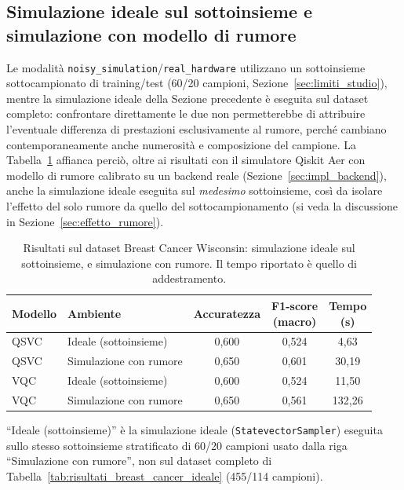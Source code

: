 \subsection{Simulazione ideale sul sottoinsieme e simulazione con modello di rumore}
Le modalità \texttt{noisy\_simulation}/\texttt{real\_hardware} utilizzano un sottoinsieme sottocampionato di training/test (60/20 campioni, Sezione~\ref{sec:limiti_studio}), mentre la simulazione ideale della Sezione precedente è eseguita sul dataset completo: confrontare direttamente le due non permetterebbe di attribuire l'eventuale differenza di prestazioni esclusivamente al rumore, perché cambiano contemporaneamente anche numerosità e composizione del campione. La Tabella~\ref{tab:risultati_breast_cancer_rumore} affianca perciò, oltre ai risultati con il simulatore Qiskit Aer con modello di rumore calibrato su un backend reale (Sezione~\ref{sec:impl_backend}), anche la simulazione ideale eseguita sul \emph{medesimo} sottoinsieme, così da isolare l'effetto del solo rumore da quello del sottocampionamento (si veda la discussione in Sezione~\ref{sec:effetto_rumore}).
\newline
\begin{table}[htbp]
\centering
\caption{Risultati sul dataset Breast Cancer Wisconsin: simulazione ideale sul sottoinsieme, e simulazione con rumore. Il tempo riportato è quello di addestramento.}
\label{tab:risultati_breast_cancer_rumore}
{\renewcommand{\arraystretch}{1.5} %
\footnotesize
\begin{tabular}{>{\raggedright\arraybackslash}p{1.6cm}>{\raggedright\arraybackslash}p{3.4cm}ccc}
\toprule
\textbf{Modello} & \textbf{Ambiente} & \textbf{Accuratezza} & \thead{\textbf{F1-score}\\\textbf{(macro)}} & \thead{\textbf{Tempo}\\\textbf{(s)}} \\
\midrule
QSVC & Ideale (sottoinsieme) & 0,600 & 0,524 & 4,63 \\
QSVC & Simulazione con rumore & 0,650 & 0,601 & 30,19 \\
VQC & Ideale (sottoinsieme) & 0,600 & 0,524 & 11,50 \\
VQC & Simulazione con rumore & 0,650 & 0,561 & 132,26 \\
\bottomrule
\end{tabular}
}

\medskip
{\footnotesize ``Ideale (sottoinsieme)'' è la simulazione ideale (\texttt{StatevectorSampler}) eseguita sullo stesso sottoinsieme stratificato di 60/20 campioni usato dalla riga ``Simulazione con rumore'', non sul dataset completo di Tabella~\ref{tab:risultati_breast_cancer_ideale} (455/114 campioni).}
\end{table}

